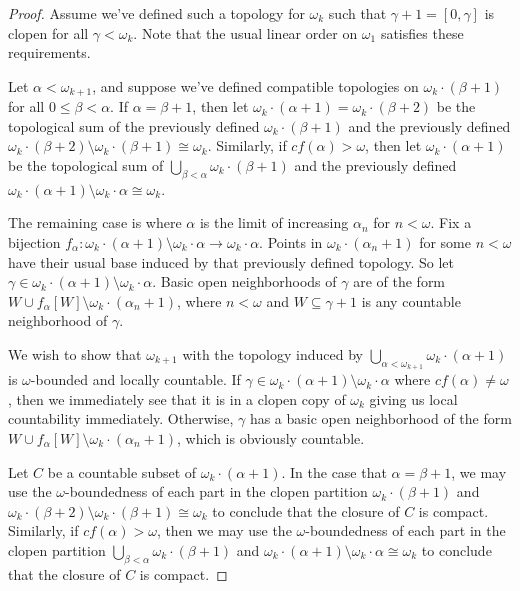 \documentclass[11pt]{article}
\begin{document}
  \begin{proof}
    Assume we've defined such a topology for \(\omega_k\)
    such that \(\gamma+1=[0,\gamma]\) is clopen for all \(\gamma<\omega_k\).
    Note that the usual linear order on \(\omega_1\) satisfies these requirements.

    Let \(\alpha<\omega_{k+1}\), and suppose we've defined compatible topologies on
    \(\omega_k\cdot (\beta+1)\) for all \(0\leq\beta<\alpha\).
    If \(\alpha=\beta+1\), then let
    \(\omega_k\cdot(\alpha+1)=\omega_k\cdot(\beta+2)\) be the topological sum
    of the previously defined \(\omega_k\cdot(\beta+1)\) and the
    previously defined
    \(\omega_k\cdot(\beta+2)\setminus\omega_k\cdot(\beta+1)\cong\omega_k\).
    Similarly, if \(cf(\alpha)>\omega\), then let \(\omega_k\cdot(\alpha+1)\)
    be the topological sum of \(\bigcup_{\beta<\alpha}\omega_k\cdot(\beta+1)\)
    and the previously defined
    \(\omega_k\cdot(\alpha+1)\setminus\omega_k\cdot\alpha\cong\omega_k\).

    The remaining case is where \(\alpha\) is the limit of increasing
    \(\alpha_n\) for \(n<\omega\). Fix a bijection
    \(
      f_\alpha
        :
      \omega_k\cdot(\alpha+1)\setminus\omega_k\cdot\alpha
        \to
      \omega_k\cdot\alpha
    \). Points in \(\omega_k\cdot(\alpha_n+1)\) for some \(n<\omega\)
    have their usual base induced by that previously defined topology. So let
    \(\gamma\in\omega_k\cdot(\alpha+1)\setminus\omega_k\cdot\alpha\).
    Basic open neighborhoods of \(\gamma\) are of the form
    \(
      W
        \cup
      f_\alpha[W]
        \setminus
      \omega_k\cdot(\alpha_n+1)
    \),
    where \(n<\omega\) and
    \(W\subseteq\gamma+1\) is any countable neighborhood of \(\gamma\).

    We wish to show that \(\omega_{k+1}\) with the topology induced by
    \(\bigcup_{\alpha<\omega_{k+1}}\omega_k\cdot(\alpha+1)\) is \(\omega\)-bounded
    and locally countable. If
    \(\gamma\in\omega_k\cdot(\alpha+1)\setminus\omega_k\cdot\alpha\) where
    \(cf(\alpha)\not=\omega\), then we immediately see that it is in a clopen
    copy of \(\omega_k\) giving us local countability
    immediately. Otherwise, \(\gamma\) has a basic open neighborhood of the form
    \(
      W
        \cup
      f_\alpha[W]
        \setminus
      \omega_k\cdot(\alpha_n+1)
    \),
    which is obviously countable.

    Let \(C\) be a countable subset of \(\omega_k\cdot(\alpha+1)\).
    In the case that \(\alpha=\beta+1\), we may use the \(\omega\)-boundedness
    of each part in the clopen partition \(\omega_k\cdot(\beta+1)\) and
    \(\omega_k\cdot(\beta+2)\setminus\omega_k\cdot(\beta+1)\cong\omega_k\)
    to conclude that the closure of \(C\) is compact.
    Similarly, if \(cf(\alpha)>\omega\),
    then we may use the  \(\omega\)-boundedness
    of each part in the clopen partition
    \(\bigcup_{\beta<\alpha}\omega_k\cdot(\beta+1)\) and
    \(\omega_k\cdot(\alpha+1)\setminus\omega_k\cdot\alpha\cong\omega_k\)
    to conclude that the closure of \(C\) is compact.


\end{proof}
\end{document}
